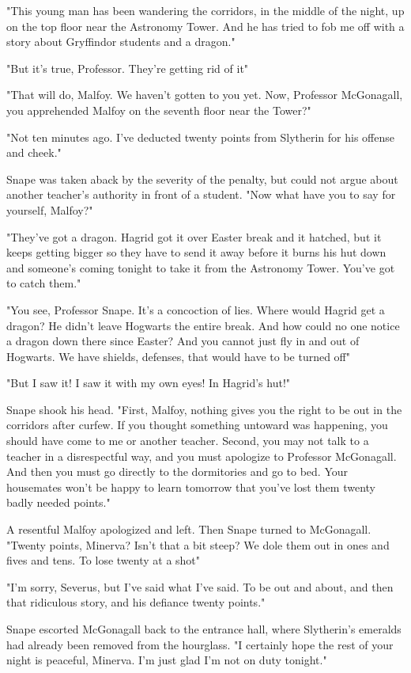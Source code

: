 "This young man has been wandering the corridors, in the middle of the night, up on the top floor near the Astronomy Tower. And he has tried to fob me off with a story about Gryffindor students and a dragon."

"But it's true, Professor. They're getting rid of it{\el}"

"That will do, Malfoy. We haven't gotten to you yet. Now, Professor McGonagall, you apprehended Malfoy on the seventh floor near the Tower?"

"Not ten minutes ago. I've deducted twenty points from Slytherin for his offense and cheek."

Snape was taken aback by the severity of the penalty, but could not argue about another teacher's authority in front of a student. "Now what have you to say for yourself, Malfoy?"

"They've got a dragon. Hagrid got it over Easter break and it hatched, but it keeps getting bigger so they have to send it away before it burns his hut down and someone's coming tonight to take it from the Astronomy Tower. You've got to catch them."

"You see, Professor Snape. It's a concoction of lies. Where would Hagrid get a dragon? He didn't leave Hogwarts the entire break. And how could no one notice a dragon down there since Easter? And you cannot just fly in and out of Hogwarts. We have shields, defenses, that would have to be turned off{\el}"

"But I saw it! I saw it with my own eyes! In Hagrid's hut!"

Snape shook his head. "First, Malfoy, nothing gives you the right to be out in the corridors after curfew. If you thought something untoward was happening, you should have come to me or another teacher. Second, you may not talk to a teacher in a disrespectful way, and you must apologize to Professor McGonagall. And then you must go directly to the dormitories and go to bed. Your housemates won't be happy to learn tomorrow that you've lost them twenty badly needed points."

A resentful Malfoy apologized and left. Then Snape turned to McGonagall. "Twenty points, Minerva? Isn't that a bit steep? We dole them out in ones and fives and tens. To lose twenty at a shot{\el}"

"I'm sorry, Severus, but I've said what I've said. To be out and about, and then that ridiculous story, and his defiance{\el} twenty points."

Snape escorted McGonagall back to the entrance hall, where Slytherin's emeralds had already been removed from the hourglass. "I certainly hope the rest of your night is peaceful, Minerva. I'm just glad I'm not on duty tonight."

